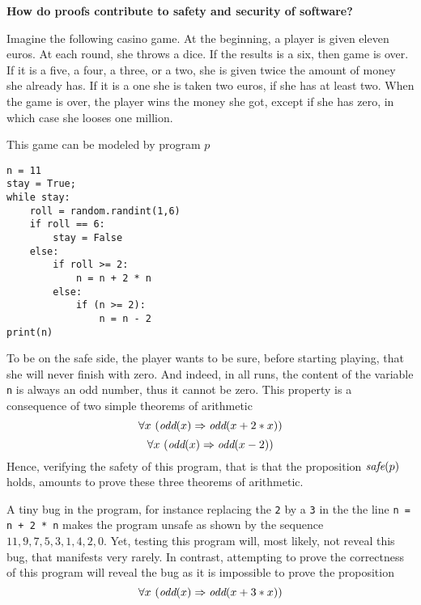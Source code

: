 \begin{framed}
\begin{center}
{\bf \Large How do proofs contribute to safety and security of software?}
\end{center}
  
Imagine the following casino game. At the beginning, a player is given
eleven euros. At each round, she throws a dice. If the results is a
six, then game is over.  If it is a five, a four, a three, or a two,
she is given twice the amount of money she already has. If it is a one
she is taken two euros, if she has at least two.  When the game is
over, the player wins the money she got, except if she has zero, in
which case she looses one million.

This game can be modeled by program $p$
\begin{verbatim}
n = 11
stay = True;
while stay: 
    roll = random.randint(1,6)
    if roll == 6:
        stay = False
    else:
        if roll >= 2:
            n = n + 2 * n
        else:
            if (n >= 2):
                n = n - 2
print(n)
\end{verbatim}

To be on the safe side, the player wants to be sure, before starting
playing, that she will never finish with zero.  And indeed, in all runs,
the content of the variable {\tt n} is always an odd number, thus it
cannot be zero. This property is a consequence of two simple
theorems of arithmetic
$$\forall x~(\mbox{\it odd}(x) \Rightarrow \mbox{\it odd}(x + 2 * x))$$
$$\forall x~(\mbox{\it odd}(x) \Rightarrow \mbox{\it odd}(x - 2))$$
Hence, verifying the safety of this program, that is that the
proposition 
${\mbox{\it safe}}(p)$ holds, 
amounts to prove these three theorems of arithmetic.

A tiny bug in the program, for instance replacing the {\tt 2} by a
{\tt 3} in the the line {\tt n = n + 2 * n} makes the program unsafe
as shown by the sequence $11, 9, 7, 5, 3, 1, 4, 2, 0$. Yet, testing
this program will, most likely, not reveal this bug, that manifests
very rarely.  In contrast, attempting to prove the correctness of this
program will
reveal the bug as it is impossible to prove the proposition
$$\forall x~(\mbox{\it odd}(x) \Rightarrow \mbox{\it odd}(x + 3 * x))$$
\end{framed}
\pagebreak
